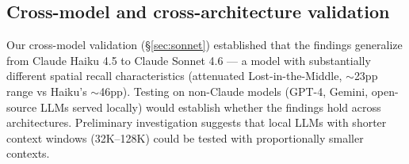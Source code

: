 \subsection{Cross-model and cross-architecture validation}
\label{sec:cross-arch}

Our cross-model validation (\S\ref{sec:sonnet}) established that the findings generalize
from Claude Haiku 4.5 to Claude Sonnet 4.6 --- a model with substantially
different spatial recall characteristics (attenuated Lost-in-the-Middle,
$\sim$23pp range vs Haiku's $\sim$46pp). Testing on
non-Claude models (GPT-4, Gemini, open-source LLMs served locally) would
establish whether the findings hold across architectures. Preliminary
investigation suggests that local LLMs with shorter context windows
(32K--128K) could be tested with proportionally smaller contexts.
